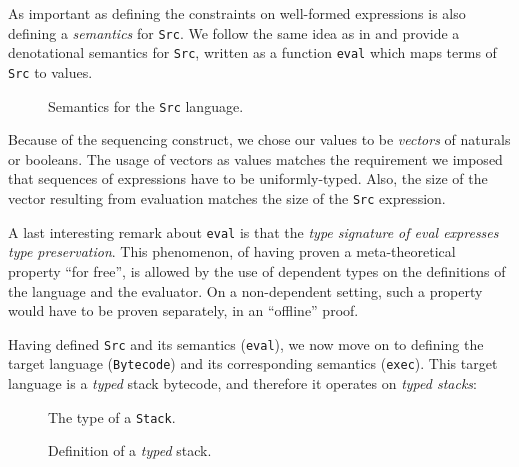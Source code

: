 \documentclass[a4paper]{article}
\begin{document}
        As important as defining the constraints on well-formed expressions is also defining
        a \emph{semantics} for \texttt{Src}. We follow the same idea as in \cite{typed-stack-safe-compiler}
        and provide a denotational semantics for \texttt{Src}, written as a function \texttt{eval}
        which maps terms of \texttt{Src} to values.

        \begin{figure}[h!]
            \caption{Semantics for the \texttt{Src} language.
                \label{lst:eval}
            }
        \end{figure}

        Because of the sequencing construct, we chose our values to be \emph{vectors} of naturals or
        booleans. The usage of vectors as values matches the requirement we imposed that sequences
        of expressions have to be uniformly-typed. Also, the size of the vector resulting from
        evaluation matches the size of the \texttt{Src} expression.

        A last interesting remark about \texttt{eval} is that the \emph{type signature of eval
            expresses type preservation}. This phenomenon, of having proven a meta-theoretical
        property ``for free'', is allowed by the use of dependent types on the definitions of the
        language and the evaluator. On a non-dependent setting, such a property would have to be
        proven separately, in an ``offline'' proof.

        Having defined \texttt{Src} and its semantics (\texttt{eval}),
        we now move on to defining the target language (\texttt{Bytecode}) and its corresponding semantics (\texttt{exec}).
        This target language is a \emph{typed} stack bytecode, and therefore it operates on \emph{typed stacks}:

        \begin{figure}[h!]
            \caption{The type of a \texttt{Stack}.
                \label{lst:stacktype}
            }
        \end{figure}

        \begin{figure}[h!]
            \caption{Definition of a \emph{typed} stack.
                \label{lst:stack}
            }
        \end{figure}
\end{document}
